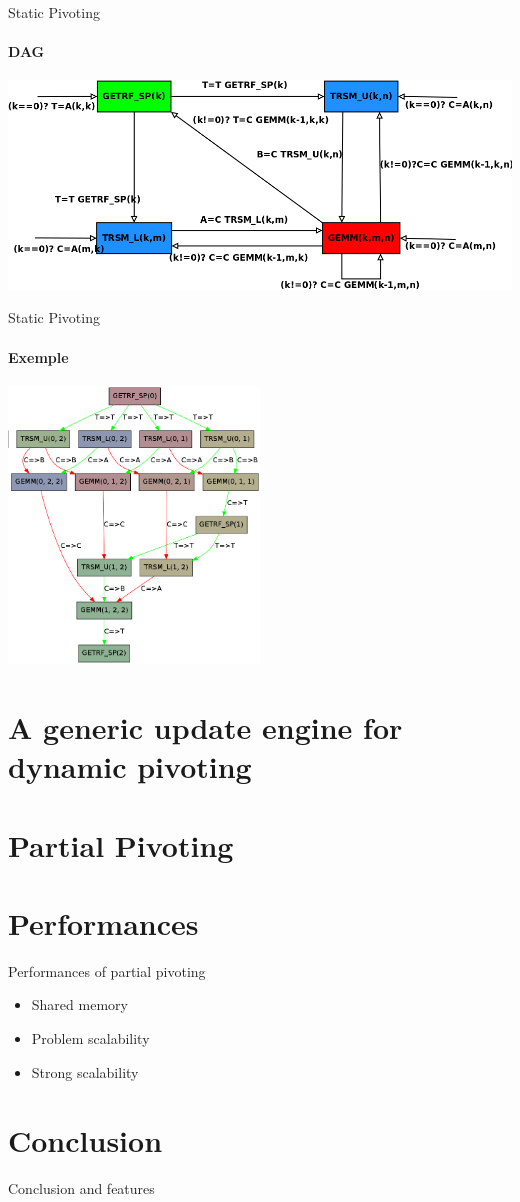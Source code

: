 \documentclass{beamer}
\begin{document}
\begin{frame}{Static Pivoting}
\framesubtitle{DAG}
\begin{center}
\includegraphics[width=\textwidth]{dag_getrf_sp.png} 
\end{center}
\end{frame}

\begin{frame}{Static Pivoting}
\framesubtitle{Exemple}
\begin{center}
\includegraphics[width=0.5\textwidth]{dag.png} 
\end{center}
\end{frame}

\section{A generic update engine for dynamic pivoting}


\section{Partial Pivoting}


\section{Performances}
\begin{frame}{Performances of partial pivoting}
\begin{itemize}
\item Shared memory
\item Problem scalability
\item Strong scalability
\end{itemize}
\end{frame}

\section*{Conclusion}
\begin{frame}{Conclusion and features}
\end{frame}
\end{document}
